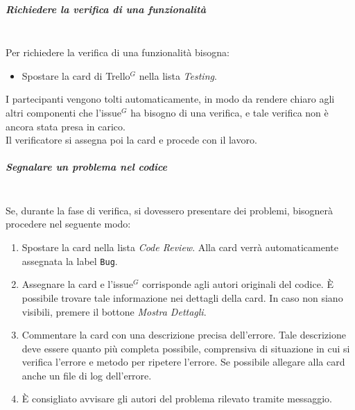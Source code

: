 \subparagraph{Richiedere la verifica di una funzionalità}
\mbox{}\\
Per richiedere la verifica di una funzionalità bisogna:
\begin{itemize}
    \item Spostare la card di Trello$^G$ nella lista \textit{Testing}.
\end{itemize}
I partecipanti vengono tolti automaticamente, in modo da rendere chiaro agli altri componenti che l'issue$^G$  ha bisogno di una verifica, e tale verifica non è ancora stata presa in carico.\\
Il verificatore si assegna poi la card e procede con il lavoro.

\subparagraph{Segnalare un problema nel codice}
\mbox{}\\
Se, durante la fase di verifica, si dovessero presentare dei problemi, bisognerà procedere nel seguente modo:
\begin{enumerate}
    \item Spostare la card nella lista \textit{Code Review}. Alla card verrà automaticamente assegnata la label \texttt{Bug}.
    \item Assegnare la card e l'issue$^G$  corrisponde agli autori originali del codice. È possibile trovare tale informazione nei dettagli della card. In caso non siano visibili, premere il bottone \textit{Mostra Dettagli}.
    \item Commentare la card con una descrizione precisa dell'errore. Tale descrizione deve essere quanto più completa possibile, comprensiva di situazione in cui si verifica l'errore e metodo per ripetere l'errore. Se possibile allegare alla card anche un file di log dell'errore.
    \item È consigliato avvisare gli autori del problema rilevato tramite messaggio.
\end{enumerate}

